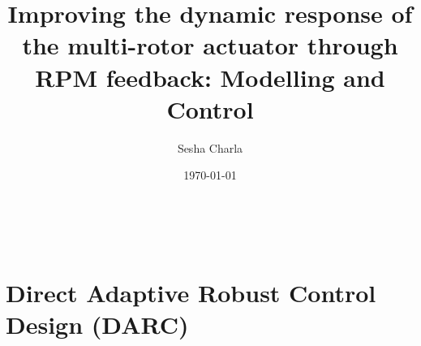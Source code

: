\documentclass[letterpaper, 11pt]{article}
\title{Improving the dynamic response of the multi-rotor actuator through RPM feedback: Modelling and Control}
\author{Sesha Charla}
\date{\today}
\begin{document}
\maketitle
\tableofcontents
\newpage
\
\newpage

\newpage

\newpage

\newpage
\section{Direct Adaptive Robust Control Design (DARC)}

%
\newpage


\end{document}
